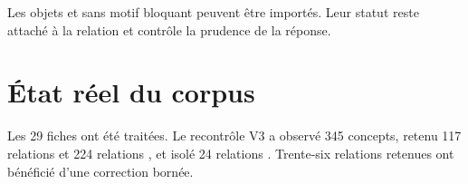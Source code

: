Les objets  et  sans motif bloquant peuvent être importés. Leur statut reste attaché à la relation et contrôle la prudence de la réponse.

\section{État réel du corpus}

Les 29 fiches ont été traitées. Le recontrôle V3 a observé 345 concepts, retenu 117 relations  et 224 relations , et isolé 24 relations . Trente-six relations retenues ont bénéficié d'une correction bornée.



